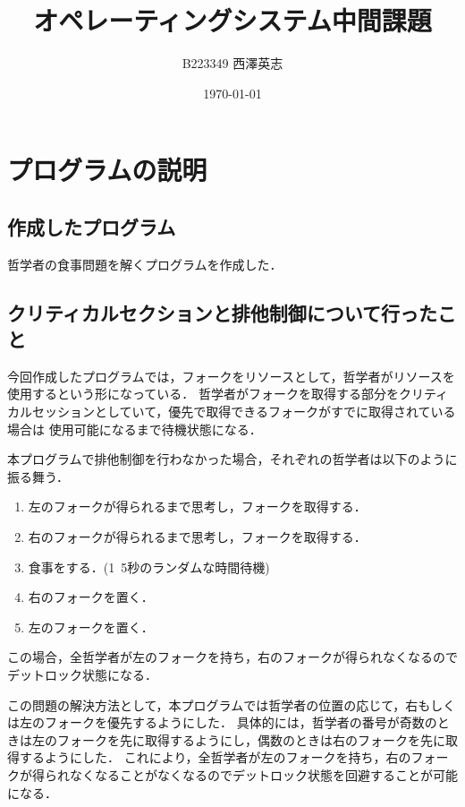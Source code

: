 \documentclass[a4paper,dvipdfmx]{jsarticle}
\begin{document}
\title{オペレーティングシステム中間課題}
\author{B223349 西澤英志}
\date{\today}
\maketitle
\section{プログラムの説明}
    \subsection{作成したプログラム}
        哲学者の食事問題を解くプログラムを作成した．
    \subsection{クリティカルセクションと排他制御について行ったこと}
        今回作成したプログラムでは，フォークをリソースとして，哲学者がリソースを使用するという形になっている．
        哲学者がフォークを取得する部分をクリティカルセッションとしていて，優先で取得できるフォークがすでに取得されている場合は
        使用可能になるまで待機状態になる．\par
        本プログラムで排他制御を行わなかった場合，それぞれの哲学者は以下のように振る舞う．
        \begin{enumerate}
            \item 左のフォークが得られるまで思考し，フォークを取得する．
            \item 右のフォークが得られるまで思考し，フォークを取得する．
            \item 食事をする．(1~5秒のランダムな時間待機)
            \item 右のフォークを置く．
            \item 左のフォークを置く．
         \end{enumerate}
         この場合，全哲学者が左のフォークを持ち，右のフォークが得られなくなるのでデットロック状態になる．\par
         この問題の解決方法として，本プログラムでは哲学者の位置の応じて，右もしくは左のフォークを優先するようにした．
         具体的には，哲学者の番号が奇数のときは左のフォークを先に取得するようにし，偶数のときは右のフォークを先に取得するようにした．
         これにより，全哲学者が左のフォークを持ち，右のフォークが得られなくなることがなくなるのでデットロック状態を回避することが可能になる．
\end{document}
